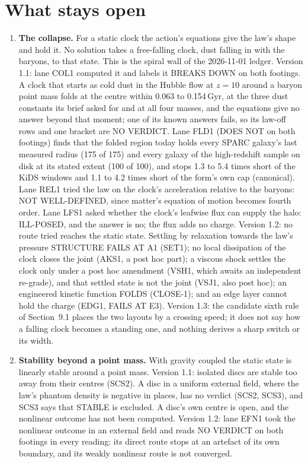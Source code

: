\documentclass[10pt]{article}
\begin{document}
\section{What stays open}
\begin{enumerate}
\item \textbf{The collapse.} For a static clock the action's equations give the law's shape and hold it. No solution takes a free-falling clock, dust falling in with the baryons, to that state. This is the spiral wall of the 2026-11-01 ledger. Version 1.1: lane COL1 computed it and labels it BREAKS DOWN on both footings. A clock that starts as cold dust in the Hubble flow at $z=10$ around a baryon point mass folds at the centre within 0.063 to 0.154\,Gyr, at the three dust constants its brief asked for and at all four masses, and the equations give no answer beyond that moment; one of its known answers fails, so its law-off rows and one bracket are NO VERDICT. Lane FLD1 (DOES NOT on both footings) finds that the folded region today holds every SPARC galaxy's last measured radius (175 of 175) and every galaxy of the high-redshift sample on disk at its stated extent (100 of 100), and stops 1.3 to 5.4 times short of the KiDS windows and 1.1 to 4.2 times short of the form's own cap (canonical). Lane REL1 tried the law on the clock's acceleration relative to the baryons: NOT WELL-DEFINED, since matter's equation of motion becomes fourth order. Lane LFS1 asked whether the clock's leafwise flux can supply the halo: ILL-POSED, and the answer is no; the flux adds no charge. Version 1.2: no route tried reaches the static state. Settling by relaxation towards the law's pressure STRUCTURE FAILS AT A1 (SET1); no local dissipation of the clock closes the joint (AKS1, a post hoc part); a viscous shock settles the clock only under a post hoc amendment (VSH1, which awaits an independent re-grade), and that settled state is not the joint (VSJ1, also post hoc); an engineered kinetic function FOLDS (CLOSE-1); and an edge layer cannot hold the charge (EDG1, FAILS AT E3). Version 1.3: the candidate sixth rule of Section~9.1 places the two layouts by a crossing speed; it does not say how a falling clock becomes a standing one, and nothing derives a sharp switch or its width.
\item \textbf{Stability beyond a point mass.} With gravity coupled the static state is linearly stable around a point mass. Version 1.1: isolated discs are stable too away from their centres (SCS2). A disc in a uniform external field, where the law's phantom density is negative in places, has no verdict (SCS2, SCS3), and SCS3 says that STABLE is excluded. A disc's own centre is open, and the nonlinear outcome has not been computed. Version 1.2: lane EFN1 took the nonlinear outcome in an external field and reads NO VERDICT on both footings in every reading: its direct route stops at an artefact of its own boundary, and its weakly nonlinear route is not converged.

\end{enumerate}
\end{document}
